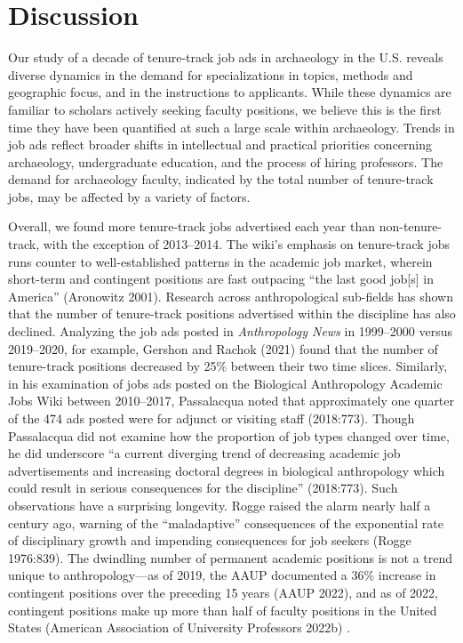 \documentclass[
  12pt,
]{article}
\begin{document}
\section{Discussion}\label{discussion}

Our study of a decade of tenure-track job ads in archaeology in the U.S.
reveals diverse dynamics in the demand for specializations in topics,
methods and geographic focus, and in the instructions to applicants.
While these dynamics are familiar to scholars actively seeking faculty
positions, we believe this is the first time they have been quantified
at such a large scale within archaeology. Trends in job ads reflect
broader shifts in intellectual and practical priorities concerning
archaeology, undergraduate education, and the process of hiring
professors. The demand for archaeology faculty, indicated by the total
number of tenure-track jobs, may be affected by a variety of factors.

Overall, we found more tenure-track jobs advertised each year than
non-tenure-track, with the exception of 2013--2014. The wiki's emphasis
on tenure-track jobs runs counter to well-established patterns in the
academic job market, wherein short-term and contingent positions are
fast outpacing ``the last good job{[}s{]} in America'' (Aronowitz 2001).
Research across anthropological sub-fields has shown that the number of
tenure-track positions advertised within the discipline has also
declined. Analyzing the job ads posted in \emph{Anthropology News} in
1999--2000 versus 2019--2020, for example, Gershon and Rachok (2021)
found that the number of tenure-track positions decreased by 25\%
between their two time slices. Similarly, in his examination of jobs ads
posted on the Biological Anthropology Academic Jobs Wiki between
2010--2017, Passalacqua noted that approximately one quarter of the 474
ads posted were for adjunct or visiting staff (2018:773). Though
Passalacqua did not examine how the proportion of job types changed over
time, he did underscore ``a current diverging trend of decreasing
academic job advertisements and increasing doctoral degrees in
biological anthropology which could result in serious consequences for
the discipline'' (2018:773). Such observations have a surprising
longevity. Rogge raised the alarm nearly half a century ago, warning of
the ``maladaptive'' consequences of the exponential rate of disciplinary
growth and impending consequences for job seekers (Rogge 1976:839). The
dwindling number of permanent academic positions is not a trend unique
to anthropology---as of 2019, the AAUP documented a 36\% increase in
contingent positions over the preceding 15 years (AAUP 2022), and as of
2022, contingent positions make up more than half of faculty positions
in the United States (American Association of University Professors
2022b) .
\end{document}
